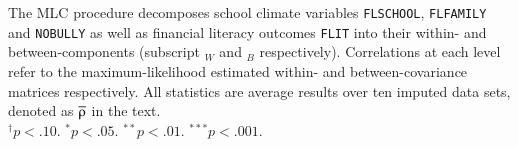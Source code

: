 {\begin{tabular}{cl r@{\hskip -0.1mm}l r@{\hskip -0.1mm}l r@{\hskip -0.1mm}l r@{\hskip -0.1mm}l r@{\hskip -0.1mm}l r@{\hskip -0.1mm}l r@{\hskip -0.1mm}l r@{\hskip -0.1mm}l r@{\hskip -0.1mm}l r@{\hskip -0.1mm}l}
        \cmidrule[0.08em]{1-14}
      \end{tabular}
}{The MLC procedure decomposes school climate variables \texttt{FLSCHOOL}, \texttt{FLFAMILY} and \texttt{NOBULLY} as well as financial literacy outcomes \texttt{FLIT} into their within- and between-components (subscript $_W$ and $_B$ respectively). Correlations at each level refer to the maximum-likelihood estimated within- and between-covariance matrices respectively. All statistics are average results over ten imputed data sets, denoted as $\lbar{\rho}$ in the text.\\
$^\dagger p < .10$. $^* p < .05$. $^{**} p < .01$. $^{***} p < .001$.}
